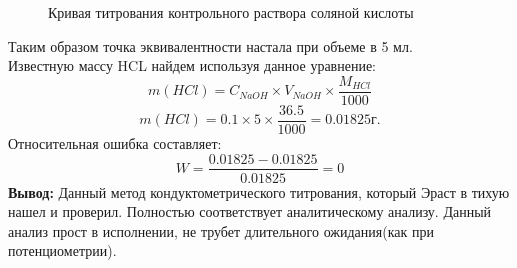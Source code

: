 \documentclass{article}
\begin{document}
\begin{figure}[h]
    \centering
    \caption{Кривая титрования контрольного раствора соляной кислоты}
\end{figure}
    Таким образом точка эквивалентности настала при объеме в 5 мл.\\
    Известную массу HCL найдем используя данное уравнение:
    \begin{equation}
        m(HCl) = C_{NaOH} \times V_{NaOH} \times \frac{M_{HCl}}{1000}
    \end{equation}
    \begin{equation}
        m(HCl) = 0.1 \times 5 \times \frac{36.5}{1000} = 0.01825 г.
    \end{equation}
    Относительная ошибка составляет:
     \begin{equation}
        W = \frac{0.01825-0.01825}{0.01825} = 0
    \end{equation}
    \textbf{Вывод:} Данный метод кондуктометрического титрования, который Эраст в тихую нашел и проверил. Полностью соответствует аналитическому анализу. Данный анализ прост в исполнении, не трубет длительного ожидания(как при потенциометрии).
    
\end{document}
